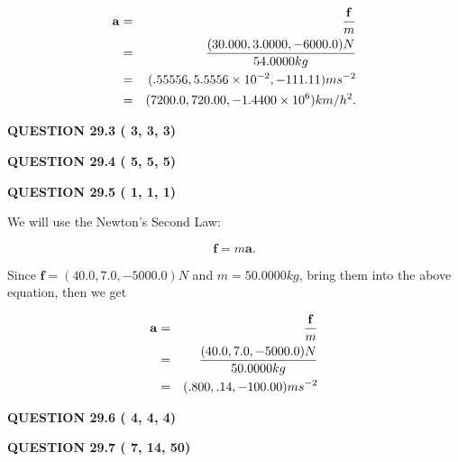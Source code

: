 \documentclass[12pt]{article}
\begin{document}
\begin{eqnarray*}
\mathbf{a}&=&\frac{\mathbf{f}}m  \\
&=&\frac{(
30.000 ,
3.0000 ,
-6000.0 )N
}{ %
54.0000 kg}  \\
&=&(
.55556 ,
5.5556 \times 10^{-2},
-111.11
)ms^{-2} \\
&=&(
7200.0 ,
720.00 ,
-1.4400 \times 10^{6}
)km/h^2.
\end{eqnarray*}
 
 
 
  
\vspace{0.2in}
  
{\textbf{\Large{QUESTION
29.3 
 (          3,          3,          3)
}}}
  
  
  
\vspace{0.2in}
  
{\textbf{\Large{QUESTION
29.4 
 (          5,          5,          5)
}}}
  
  
  
\vspace{0.2in}
  
{\textbf{\Large{QUESTION
29.5 
 (          1,          1,          1)
}}}
  
  


 
 

We will use the Newton's Second Law:
 
\[
\mathbf{f}=m\mathbf{a}.
\]
 
Since $\mathbf{f}= %
(40.0 , 7.0 , -5000.0) N$
and $m= %
50.0000kg$, bring them into the above equation, then we get
 
\begin{eqnarray*}
\mathbf{a}&=&\frac{\mathbf{f}}m  \\
&=&\frac{ %
(40.0 , 7.0 , -5000.0) N}{ %
50.0000kg}  \\
&=& %
(.800 , .14 , -100.00) ms^{-2}
\end{eqnarray*}
 
 
 
  
\vspace{0.2in}
  
{\textbf{\Large{QUESTION
29.6 
 (          4,          4,          4)
}}}
  
  
  
\vspace{0.2in}
  
{\textbf{\Large{QUESTION
29.7 
 (          7,         14,         50)
}}}
  
\end{document}
